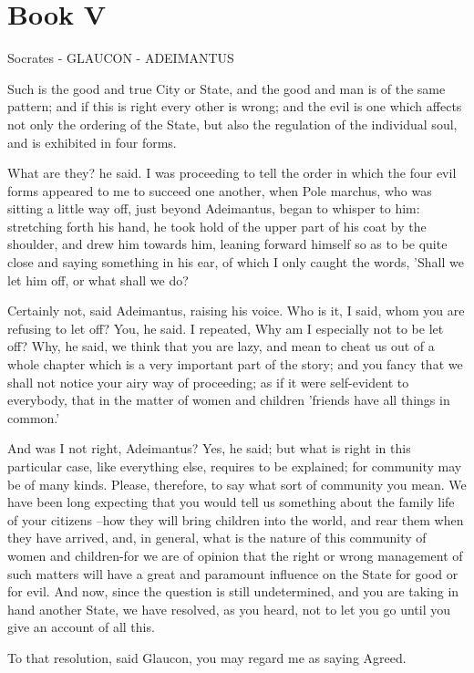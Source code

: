 \chapter{Book V}

Socrates - GLAUCON - ADEIMANTUS

Such is the good and true City or State, and the good and man is of the same pattern; and if this is right every other is wrong; and the evil is one which affects not only the ordering of the State, but also the regulation of the individual soul, and is exhibited in four forms.

What are they? he said.
I was proceeding to tell the order in which the four evil forms appeared to me to succeed one another, when Pole marchus, who was sitting a little way off, just beyond Adeimantus, began to whisper to him: stretching forth his hand, he took hold of the upper part of his coat by the shoulder, and drew him towards him, leaning forward himself so as to be quite close and saying something in his ear, of which I only caught the words, 'Shall we let him off, or what shall we do?

Certainly not, said Adeimantus, raising his voice.
Who is it, I said, whom you are refusing to let off?
You, he said.
I repeated, Why am I especially not to be let off?
Why, he said, we think that you are lazy, and mean to cheat us out of a whole chapter which is a very important part of the story; and you fancy that we shall not notice your airy way of proceeding; as if it were self-evident to everybody, that in the matter of women and children 'friends have all things in common.'

And was I not right, Adeimantus?
Yes, he said; but what is right in this particular case, like everything else, requires to be explained; for community may be of many kinds. Please, therefore, to say what sort of community you mean. We have been long expecting that you would tell us something about the family life of your citizens --how they will bring children into the world, and rear them when they have arrived, and, in general, what is the nature of this community of women and children-for we are of opinion that the right or wrong management of such matters will have a great and paramount influence on the State for good or for evil. And now, since the question is still undetermined, and you are taking in hand another State, we have resolved, as you heard, not to let you go until you give an account of all this.

To that resolution, said Glaucon, you may regard me as saying Agreed.

